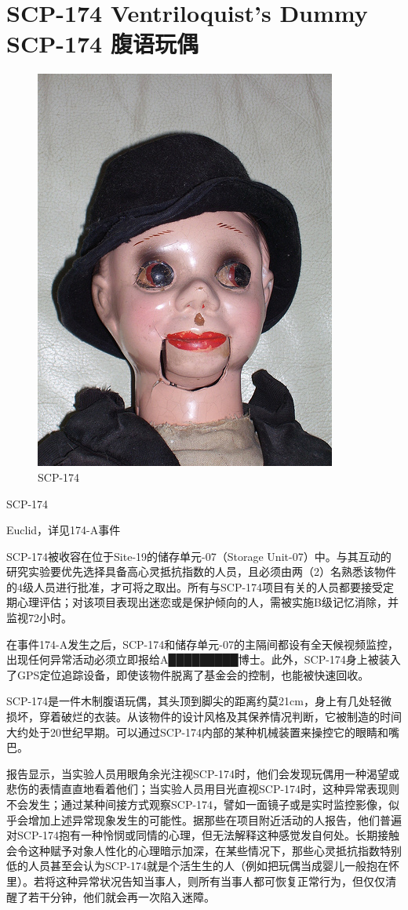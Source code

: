 \chapter[SCP-174 腹语玩偶]{
    SCP-174 Ventriloquist's Dummy\\
    SCP-174 腹语玩偶
}

\label{chap:SCP-174}

\begin{figure}[H]
    \centering
    \includegraphics[width=0.5\linewidth]{images/SCP-174.jpg}
    \caption*{SCP-174}
\end{figure}

SCP-174

 Euclid，详见174-A事件

SCP-174被收容在位于Site-19的储存单元-07（Storage Unit-07）中。与其互动的研究实验要优先选择具备高心灵抵抗指数的人员，且必须由两（2）名熟悉该物件的4级人员进行批准，才可将之取出。所有与SCP-174项目有关的人员都要接受定期心理评估；对该项目表现出迷恋或是保护倾向的人，需被实施B级记忆消除，并监视72小时。

在事件174-A发生之后，SCP-174和储存单元-07的主隔间都设有全天候视频监控，出现任何异常活动必须立即报给A█████████博士。此外，SCP-174身上被装入了GPS定位追踪设备，即使该物件脱离了基金会的控制，也能被快速回收。

SCP-174是一件木制腹语玩偶，其头顶到脚尖的距离约莫21cm，身上有几处轻微损坏，穿着破烂的衣装。从该物件的设计风格及其保养情况判断，它被制造的时间大约处于20世纪早期。可以通过SCP-174内部的某种机械装置来操控它的眼睛和嘴巴。

报告显示，当实验人员用眼角余光注视SCP-174时，他们会发现玩偶用一种渴望或悲伤的表情直直地看着他们；当实验人员用目光直视SCP-174时，这种异常表现则不会发生；通过某种间接方式观察SCP-174，譬如一面镜子或是实时监控影像，似乎会增加上述异常现象发生的可能性。据那些在项目附近活动的人报告，他们普遍对SCP-174抱有一种怜悯或同情的心理，但无法解释这种感觉发自何处。长期接触会令这种赋予对象人性化的心理暗示加深，在某些情况下，那些心灵抵抗指数特别低的人员甚至会认为SCP-174就是个活生生的人（例如把玩偶当成婴儿一般抱在怀里）。若将这种异常状况告知当事人，则所有当事人都可恢复正常行为，但仅仅清醒了若干分钟，他们就会再一次陷入迷障。

